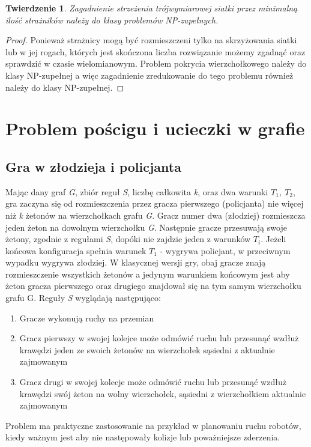 \documentclass[brudnopis]{xmgr}
\newtheorem{Twierdzenie}{Twierdzenie} \theoremstyle{definition}
\begin{document}
\begin{Twierdzenie}
	Zagadnienie strzeżenia trójwymiarowej siatki przez minimalną ilość strażników należy do klasy problemów NP-zupełnych.
\end{Twierdzenie}
\begin{proof} 
	Ponieważ strażnicy mogą być rozmieszczeni tylko na skrzyżowania siatki lub w jej rogach, których jest skończona liczba rozwiązanie możemy zgadnąć oraz sprawdzić w czasie wielomianowym. Problem pokrycia wierzchołkowego należy do klasy NP-zupełnej a więc zagadnienie zredukowanie do tego problemu również należy do klasy NP-zupełnej.
\end{proof}

\chapter{Problem pościgu i ucieczki w grafie}
\section{Gra w złodzieja i policjanta}
Mając dany graf \textit{G}, zbiór reguł \textit{S}, liczbę całkowita \textit{k}, oraz dwa warunki \textit{$T_1$, $T_2$}, gra zaczyna się od rozmieszczenia przez gracza pierwszego (policjanta) nie więcej niż \textit{k} żetonów na wierzchołkach grafu \textit{G}. Gracz numer dwa (złodziej) rozmieszcza jeden żeton na dowolnym wierzchołku \textit{G}. Następnie gracze przesuwają swoje żetony, zgodnie z regułami \textit{S}, dopóki nie zajdzie jeden z warunków $T_i$. Jeżeli końcowa konfiguracja spełnia warunek $T_1$ - wygrywa policjant, w przeciwnym wypadku wygrywa złodziej. W klasycznej wersji gry, obaj gracze znają rozmieszczenie wszystkich żetonów a jedynym warunkiem końcowym jest aby żeton gracza pierwszego oraz drugiego znajdował się na tym samym wierzchołku grafu G.
Reguły \textit{S} wyglądają następująco:
\begin{enumerate}
  \item Gracze wykonują ruchy na przemian
  \item Gracz pierwszy w swojej kolejce może odmówić ruchu lub przesunąć wzdłuż krawędzi jeden ze swoich żetonów na wierzchołek sąsiedni z aktualnie zajmowanym
  \item Gracz drugi w swojej kolecje może odmówić ruchu lub przesunąć wzdłuż krawędzi swój żeton na wolny wierzchołek, sąsiedni z wierzchołkiem aktualnie zajmowanym
\end{enumerate}

Problem ma praktyczne zastosowanie na przykład w planowaniu ruchu robotów, kiedy ważnym jest aby nie następowały kolizje lub poważniejsze zderzenia.
\end{document}
